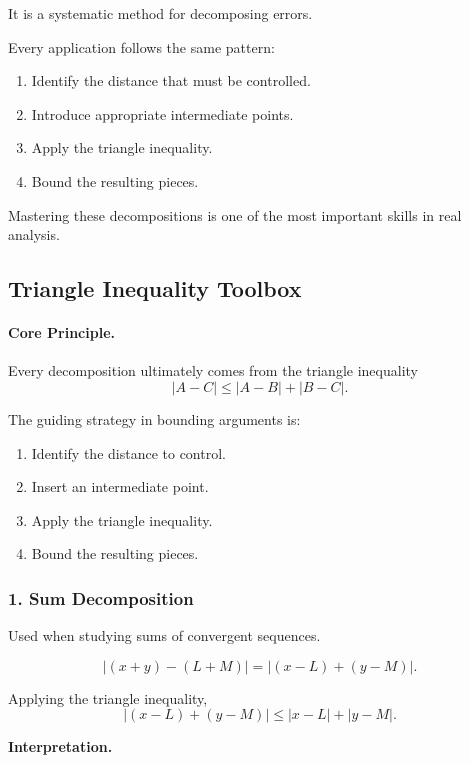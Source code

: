 It is a systematic method for decomposing errors.

Every application follows the same pattern:

\begin{enumerate}
\item Identify the distance that must be controlled.
\item Introduce appropriate intermediate points.
\item Apply the triangle inequality.
\item Bound the resulting pieces.
\end{enumerate}

Mastering these decompositions is one of the most important skills in
real analysis.

\subsection{Triangle Inequality Toolbox}
\label{sec:triangle-inequality-toolbox}

\paragraph{Core Principle.}

Every decomposition ultimately comes from the triangle inequality
\[
|A - C| \le |A - B| + |B - C|.
\]

The guiding strategy in bounding arguments is:

\begin{enumerate}
\item Identify the distance to control.
\item Insert an intermediate point.
\item Apply the triangle inequality.
\item Bound the resulting pieces.
\end{enumerate}

\bigskip

\subsubsection*{1. Sum Decomposition}

Used when studying sums of convergent sequences.

\[
|(x+y) - (L+M)|
=
|(x-L) + (y-M)|.
\]

Applying the triangle inequality,
\[
|(x-L)+(y-M)|
\le
|x-L| + |y-M|.
\]

\textbf{Interpretation.}

